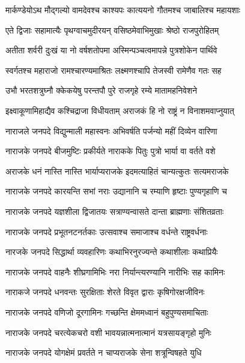 \twolineshloka
{मार्कण्डेयोऽथ मौद्गल्यो वामदेवश्च काश्यपः}
{कात्ययनो गौतमश्च जाबालिश्च महायशाः} %

\twolineshloka
{एते द्विजाः सहामात्यैः पृथग्वाचमुदीरयन्}
{वसिष्ठमेवाभिमुखाः श्रेष्ठो राजपुरोहितम्} %

\twolineshloka
{अतीता शर्वरी दुःखं या नो वर्षशतोपमा}
{अस्मिन्पञ्चत्वमापन्ने पुत्रशोकेन पार्थिवे} %

\twolineshloka
{स्वर्गतश्च महाराजो रामश्चारण्यमाश्रितः}
{लक्ष्मणश्चापि तेजस्वी रामेणैव गतः सह} %

\twolineshloka
{उभौ भरतशत्रुघ्नौ क्केकयेषु परन्तपौ}
{पुरे राजगृहे रम्ये मातामहनिवेशने} %

\twolineshloka
{इक्ष्वाकूणामिहाद्यैव कश्चिद्राजा विधीयताम्}
{अराजकं हि नो राष्ट्रं न विनाशमवाप्नुयात्} %

\twolineshloka
{नाराजले जनपदे विद्युन्माली महास्वनः}
{अभिवर्षति पर्जन्यो महीं दिव्येन वारिणा} %

\twolineshloka
{नाराजके जनपदे बीजमुष्टिः प्रकीर्यते}
{नाराकके पितुः पुत्रो भार्या वा वर्तते वशे} %

\twolineshloka
{अराजके धनं नास्ति नास्ति भार्याप्यराजके}
{इदमत्याहितं चान्यत्कुतः सत्यमराजके} %

\twolineshloka
{नाराजके जनपदे कारयन्ति सभां नराः}
{उद्यानानि च रम्याणि हृष्टाः पुण्यगृहाणि च} %

\twolineshloka
{नाराजके जनपदे यज्ञशीला द्विजातयः}
{सत्राण्यन्वासते दान्ता ब्राह्मणाः संशितव्रताः} %

\twolineshloka
{नाराजके जनपदे प्रभूतनटनर्तकाः}
{उत्सवाश्च समाजाश्च वर्धन्ते राष्ट्रवर्धनाः} %

\twolineshloka
{नारजके जनपदे सिद्धार्था व्यवहारिणः}
{कथाभिरनुरज्यन्ते कथाशीलाः कथाप्रियैः} %

\twolineshloka
{नाराजके जनपदे वाहनैः शीघ्रगामिभिः}
{नरा निर्यान्त्यरण्यानि नारीभिः सह कामिनः} %

\twolineshloka
{नाराकजे जनपदे धनवन्तः सुरक्षिताः}
{शेरते विवृत द्वाराः कृषिगोरक्षजीविनः} %

\twolineshloka
{नाराजके जनपदे वणिजो दूरगामिनः}
{गच्छन्ति क्षेममध्वानं बहुपुण्यसमाचिताः} %

\twolineshloka
{नाराजके जनपदे चरत्येकचरो वशी}
{भावयन्नात्मनात्मानं यत्रसायङ्गृहो मुनिः} %

\twolineshloka
{नाराजके जनपदे योगक्षेमं प्रवर्तते}
{न चाप्यराजके सेना शत्रून्विषहते युधि} %

